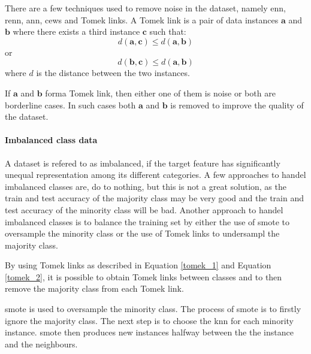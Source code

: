 \documentclass[10pt, conference]{IEEEtran}
\begin{document}
There are a few techniques used to remove noise in the dataset, namely \acrfull{enn}, \acrfull{renn}, \acrfull{ann},
\acrfull{cews} and Tomek links. A Tomek link is a pair of data instances $\boldsymbol{\textbf{a}}$ and
$\boldsymbol{\textbf{b}}$ where there exists a third instance $\boldsymbol{\textbf{c}}$ such that:
\begin{equation}
    d(\boldsymbol{\textbf{a}}, \boldsymbol{\textbf{c}}) \leq d(\boldsymbol{\textbf{a}}, \boldsymbol{\textbf{b}}) \label{tomek_1}
\end{equation}
or
\begin{equation}
    d(\boldsymbol{\textbf{b}}, \boldsymbol{\textbf{c}}) \leq d(\boldsymbol{\textbf{a}}, \boldsymbol{\textbf{b}}) \label{tomek_2}
\end{equation}
where $d$ is the distance between the two instances.

If $\boldsymbol{\textbf{a}}$ and $\boldsymbol{\textbf{b}}$ forma Tomek link, then either one of them is noise
or both are borderline cases. In such cases both $\boldsymbol{\textbf{a}}$ and $\boldsymbol{\textbf{b}}$
is removed to improve the quality of the dataset.

\paragraph{Imbalanced class data}

A dataset is refered to as imbalanced, if the target feature has significantly unequal
representation among its different categories. A few approaches to handel imbalanced classes are, do to
nothing, but this is not a great solution, as the train and test accuracy of the majority class may be
very good and the train and test accuracy of the minority class will be bad. Another approach to
handel imbalanced classes is to balance the training set by either the use of \acrfull{smote}
to oversample the minority class or the use of Tomek links to undersampl the majority class.

By using Tomek links as described in Equation \eqref{tomek_1} and Equation \eqref{tomek_2}, it is possible
to obtain Tomek links between classes and to then remove the majority class from each Tomek link.

\acrshort{smote} is used to oversample the minority class. The process of \acrshort{smote} is to
firstly ignore the majority class. The next step is to choose the \acrshort{knn} for each minority
instance. \acrshort{smote} then produces new instances halfway between the the instance and the
neighbours.
\end{document}
